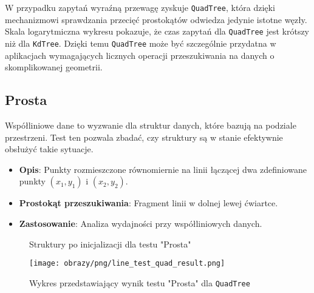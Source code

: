 \documentclass[12pt]{article}
\begin{document}
\noindent W przypadku zapytań wyraźną przewagę zyskuje \texttt{QuadTree}, która dzięki mechanizmowi sprawdzania przecięć prostokątów odwiedza jedynie istotne węzły. Skala logarytmiczna wykresu pokazuje, że czas zapytań dla \texttt{QuadTree} jest krótszy niż dla \texttt{KdTree}. Dzięki temu \texttt{QuadTree} może być szczególnie przydatna w aplikacjach wymagających licznych operacji przeszukiwania na danych o skomplikowanej geometrii.


\newpage
\subsection{Prosta}
Współliniowe dane to wyzwanie dla struktur danych, które bazują na podziale przestrzeni. Test ten pozwala zbadać, czy struktury są w stanie efektywnie obsłużyć takie sytuacje.
\begin{itemize}
    \item \textbf{Opis}: Punkty rozmieszczone równomiernie na linii łączącej dwa zdefiniowane punkty \( (x_1, y_1) \) i \( (x_2, y_2) \).
    \item \textbf{Prostokąt przeszukiwania}: Fragment linii w dolnej lewej ćwiartce.
    \item \textbf{Zastosowanie}: Analiza wydajności przy współliniowych danych.
\end{itemize}

\begin{figure}[h]
    \centering
    \qquad
    \caption{Struktury po inicjalizacji dla testu "Prosta"}%
    \label{fig:line}%
\end{figure}

\begin{figure}[h]
    \centering
    \texttt{[image: obrazy/png/line\_test\_quad\_result.png]}
    \caption{Wykres przedstawiający wynik testu "Prosta" dla \texttt{QuadTree}}
    \label{fig:line_test_quad_result}
\end{figure}
\end{document}
